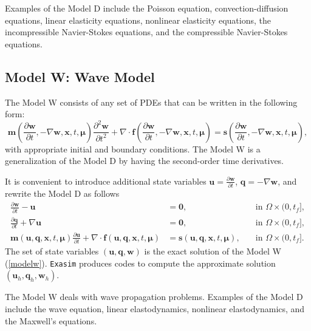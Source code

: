 \documentclass[11pt]{article}
\begin{document}
Examples of the Model D include the Poisson equation, convection-diffusion equations, linear elasticity equations, nonlinear elasticity equations, the incompressible Navier-Stokes equations, and the compressible Navier-Stokes equations. 

\subsection{Model W: Wave Model}

The Model W consists of any set of PDEs that can be written in the following form:
\begin{equation}
\label{modelw0}
\bm m \left(\frac{\partial \bm{w}}{\partial t}, - \nabla \bm w, \bm x,t, \bm \mu\right) \frac{\partial^2 \bm{w}}{\partial t^2}  + \nabla \cdot \bm{f} \left(\frac{\partial \bm{w}}{\partial t}, - \nabla \bm w, \bm x,t, \bm \mu\right) = \bm s \left(\frac{\partial \bm{w}}{\partial t}, - \nabla \bm w, \bm x,t, \bm \mu\right), 
\end{equation}
with appropriate initial and boundary conditions. The Model W is a generalization of the Model D by having the second-order time derivatives.


It is convenient to introduce additional state variables $\bm u = \frac{\partial \bm{w}}{\partial t}$,  $\bm q = - \nabla \bm w$,  and rewrite the Model D as follows
\begin{subequations}
\label{modelw}
\begin{alignat}{2}
\frac{\partial \bm w}{\partial t} - \bm u & =  \bm 0,  & \quad \mbox{in } \Omega \times (0, t_f], \\
\frac{\partial \bm q}{\partial t} + \nabla \bm u & =  \bm 0,  & \quad \mbox{in } \Omega \times (0, t_f], \\
\bm m(\bm{u}, \bm q,  \bm x,t, \bm \mu) \frac{\partial \bm{u}}{\partial t} + \nabla \cdot \bm{f}(\bm{u}, \bm q, \bm x,t, \bm \mu) &=  \bm s(\bm{u}, \bm q,   \bm x,t, \bm \mu), & \quad \mbox{in } \Omega \times (0, t_f].  
\end{alignat}
\end{subequations}
The set of state variables $(\bm u, \bm q, \bm w)$ is the exact solution of the Model W (\ref{modelw}). \texttt{Exasim} produces codes to compute the approximate solution $(\bm u_h, \bm q_h, \bm w_h)$.


The Model W deals with wave propagation problems.  Examples of the Model D include the wave equation, linear elastodynamics, nonlinear elastodynamics, and the Maxwell's equations. 
\end{document}
